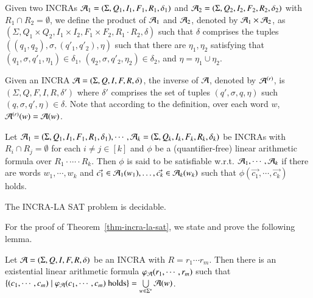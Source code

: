 \documentclass[sigplan,review,anonymous]{acmart}\settopmatter{printfolios=true,printccs=false,printacmref=false}
\newcommand{\tl}[1]{\textcolor{blue} {TL: #1 :TL} }
\begin{document}
Given two INCRAs $\mathcal{A}_1 = (\Sigma, Q_1, I_1, F_1, R_1, \delta_1)$ and $\mathcal{A}_2 = (\Sigma, Q_2, I_2, F_2, R_2, \delta_2)$ with $R_1 \cap R_2 = \emptyset$, we define the product of $\mathcal{A}_1$ and $\mathcal{A}_2$, denoted by $\mathcal{A}_1 \times \mathcal{A}_2$, as $(\Sigma, Q_1 \times Q_2, I_1 \times I_2, F_1 \times F_2, R_1 \cdot R_2, \delta)$ such that $\delta$ comprises the tuples $((q_1, q_2), \sigma, (q'_1, q'_2), \eta)$ such that there are $\eta_1, \eta_2$ satisfying that $(q_1, \sigma, q'_1, \eta_1) \in \delta_1$, $(q_2, \sigma, q'_2, \eta_2) \in \delta_2$, and $\eta = \eta_1\cup \eta_2$.

Given an INCRA $\mathcal{A}  = (\Sigma, Q, I, F, R, \delta)$, the inverse of $\mathcal{A}$, denoted by $\mathcal{A}^{(r)}$, is $(\Sigma, Q, F, I, R, \delta')$ where $\delta'$ comprises the set of tuples $(q', \sigma, q, \eta)$ such  $(q, \sigma, q', \eta) \in \delta$. Note that according to the definition, over each word $w$, $\mathcal{A}^{(r)}(w) = \mathcal{A}(w)$. 

\begin{definition}
	Let $\mathcal{A}_1=(\Sigma, Q_1, I_1, F_1, R_1, \delta_1), \cdots, \mathcal{A}_k=(\Sigma, Q_k, I_k, F_k, R_k, \delta_k)$ be INCRAs with $R_i \cap R_j = \emptyset$ for each $i \neq j \in [k]$ and $\phi$ be a (quantifier-free) linear arithmetic formula over $R_1 \cdot \cdots \cdot R_k$. Then $\phi$ is said to be satisfiable w.r.t. $\mathcal{A}_1, \cdots, \mathcal{A}_k$ if  there are words $w_1, \cdots, w_k$ and $\vec{c_1} \in \mathcal{A}_1(w_1),\dots, \vec{c_k} \in \mathcal{A}_k(w_k)$ such that $\phi(\vec{c_1}, \cdots, \vec{c_k})$ holds.
\end{definition}

\begin{theorem}\label{thm-incra-la-sat}
	The INCRA-LA SAT problem is decidable.
\end{theorem}

For the proof of Theorem~\ref{thm-incra-la-sat}, we state and prove the following lemma.

\begin{lemma}\label{lem-incra-la}
	Let $\mathcal{A}=(\Sigma, Q, I, F, R, \delta)$ be an INCRA with $R= r_1 \cdots  r_m$. Then there is an existential linear arithmetic formula $\varphi_{\mathcal{A}}(r_1, \cdots, r_m)$ such that $ \{(c_1, \cdots, c_m) \mid \varphi_{\mathcal{A}}(c_1, \cdots, c_m) \mbox{ holds}\} = \bigcup \limits_{w \in \Sigma^*} \mathcal{A}(w)$.
\end{lemma}
\end{document}
